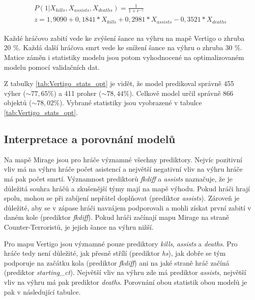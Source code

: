 \begin{align}
    \begin{split}
        &P(1 | X_{kills}, X_{assists}, X_{deaths}) = \frac{1}{1 + e^{-z}} \\
        &z = 1,9090 + 0,1841*X_{kills} + 0,2981*X_{assists} - 0,3521*X_{deaths}
    \end{split}
\end{align}

Každé hráčovo zabití vede ke zvýšení šance na výhru na mapě Vertigo o zhruba 20 \%. Každá další hráčova smrt vede ke snížení šance na výhru o zhruba 30 \%. 
Matice záměn i statistiky modelu jsou potom vyhodnocené na optimalizovaném modelu pomocí validačních dat.





Z tabulky \ref{tab:Vertigo_stats_opt} je vidět, že model predikoval správně 455 výher ($\sim 77,65 \%$) a 411 proher ($\sim 78,44 \%$).
Celkově model určil správně 866 objektů ($\sim 78,02 \%$). Vybrané statistiky jsou vyobrazené v tabulce \ref{tab:Vertigo_stats_opt}.

\subsection{Interpretace a porovnání modelů}
Na mapě Mirage jsou pro hráče významné všechny prediktory. Nejvíc pozitivní vliv má na výhru hráče počet asistencí a největší negativní vliv
na výhru hráče má pak počet smrtí. Významnost prediktorů \textit{fkdiff} a \textit{assists} naznačuje, že je důležitá souhra hráčů a zkušenější týmy
mají na mapě výhodu. Pokud hráči hrají spolu, mohou se při zabíjení nepřátel doplňovat (prediktor \textit{assists}). Zároveň je důležité, aby se v zápase
hráči navzájem podporovali a mohli získat první zabití v daném kole (prediktor \textit{fkdiff}). Pokud hráči začínají mapu Mirage na straně Counter-Terroristů,
je jejich šance na výhru nižší.

Pro mapu Vertigo jsou  významné pouze prediktory \textit{kills}, \textit{assists} a \textit{deaths}. Pro hráče tedy není důležité, jak přesně
střílí (prediktor \textit{hs}), jak dobře se tým podporuje na začátku kola (prediktor \textit{fkdiff}) ani na jaké straně hráč začíná (prediktor \textit{starting\_ct}).
Největší vliv na výhru zde má prediktor \textit{assists}, největší vliv na výhru má pak prediktor \textit{deaths}. Porovnání obou statistik obou modelů je pak
v následující tabulce.


